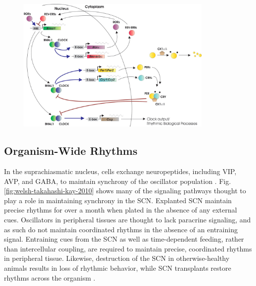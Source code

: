\begin{figure}[htb] 
    \begin{center}
        \includegraphics[width=0.85\textwidth]{intro/figures/ko-takahashi-2006.jpg}
    \end{center}
\end{figure}



\subsection*{Organism-Wide Rhythms}
In the suprachiasmatic nucleus, cells exchange neuropeptides, including VIP, AVP, and GABA, to maintain synchrony of the oscillator population \cite{Aton2005a, Welsh2010}.
Fig. \ref{fig:welsh-takahashi-kay-2010} shows many of the signaling pathways thought to play a role in maintaining synchrony in the SCN.
Explanted SCN maintain precise rhythms for over a month when plated in the absence of any external cues.
Oscillators in peripheral tissues are thought to lack paracrine signaling, and as such do not maintain coordinated rhythms in the absence of an entraining signal.
Entraining cues from the SCN as well as time-dependent feeding, rather than intercellular coupling, are required to maintain precise, coordinated rhythms in peripheral tissue.
Likewise, destruction of the SCN in otherwise-healthy animals results in loss of rhythmic behavior, while SCN transplants restore rhythms across the organism \cite{Silver1996}.



